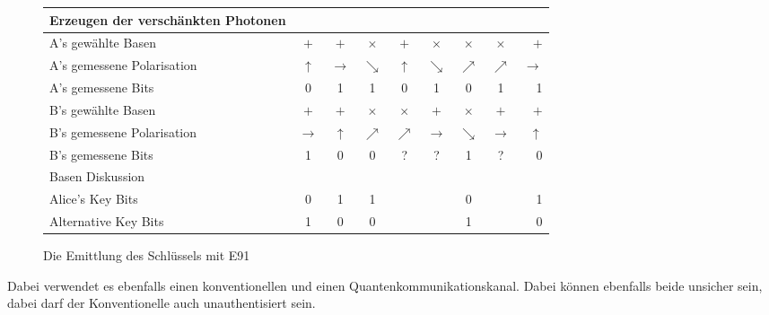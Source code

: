   \begin{figure}
  \centering
    \begin{tabular}{ l || c | c | c | c | c | c | c | r }
      \hline
      Erzeugen der versch\"ankten Photonen \\
      \hline
      A's gew\"ahlte Basen & $+$ & $+$ & $\times $ & $+$ & $\times $ & $\times $ & $\times $ & $+$ \\
      \hline
      A's gemessene Polarisation & $\uparrow$ & $\rightarrow$ & $\searrow$ & $\uparrow$ & $\searrow$ &     $\nearrow$ & $\nearrow$ & $\rightarrow$ \\
      \hline
      A's gemessene Bits & 0 & 1 & 1 & 0 & 1 & 0 & 1 & 1 \\
      \hline
      B's gew\"ahlte Basen & $+$ & $+$ & $\times $ & $\times $ & $+$ & $\times $ & $+$ & $+$ \\
      \hline
      B's gemessene Polarisation & $\rightarrow$ & $\uparrow$ & $\nearrow$ & $\nearrow$ & $\rightarrow$     & $\searrow$ & $\rightarrow$ & $\uparrow$ \\
      \hline
      B's gemessene Bits & 1 & 0 & 0 & ? & ? & 1 & ? & 0 \\
      \hline
      Basen Diskussion \\
      \hline
      Alice's Key Bits & 0 & 1 & 1 & & & 0 & & 1 \\
      Alternative Key Bits & 1 & 0 & 0 & & & 1 & & 0 \\
      \hline
    \end{tabular}
    \caption{Die Emittlung des Schl\"ussels mit E91 \label{crypto:tangtab}}
  \end{figure}

  Dabei verwendet es ebenfalls einen konventionellen und einen Quantenkommunikationskanal.
  Dabei k\"onnen ebenfalls beide unsicher sein, dabei darf der Konventionelle auch unauthentisiert sein.



